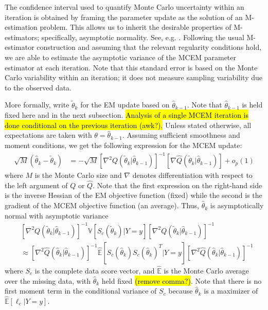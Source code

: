 \documentclass[11pt, oneside]{article}   	%
\newcommand{\bV}{\mathbb{V}}
\newcommand{\bE}{\mathbb{E}}
\newcommand{\hq}{\hat{Q}}
\begin{document}
The confidence interval used to quantify Monte Carlo uncertainty within an iteration is obtained by framing the parameter update as the solution of an M-estimation problem. This allows us to inherit the desirable properties of M-estimators; specifically, asymptotic normality. See, e.g. \citet{van98}. Following the usual M-estimator construction and assuming that the relevant regularity conditions hold, we are able to estimate the asymptotic variance of the MCEM parameter estimator at each iteration. Note that this standard error is based on the Monte Carlo variability within an iteration; it does not measure sampling variability due to the observed data. 

More formally, write $\tilde{\theta}_k$ for the EM update based on $\hat{\theta}_{k-1}$. Note that $\hat{\theta}_{k-1}$ is held fixed here and in the next subsection. \hl{Analysis of a single MCEM iteration is done conditional on the previous iteration (awk?).} Unless stated otherwise, all expectations are taken with $\theta = \hat{\theta}_{k-1}$. Assuming sufficient smoothness and moment conditions, we get the following expression for the MCEM update:
%
\begin{align}
    \sqrt{M}(\hat{\theta}_k - \tilde{\theta}_k) &= - \sqrt{M} \left[ \nabla^2 Q(\tilde{\theta}_k|\hat{\theta}_{k-1})\right]^{-1} \left[\nabla \hq(\tilde{\theta}_k|\hat{\theta}_{k-1}) \right] + o_p(1) \label{eq:th_as_dist}
\end{align}
%
where $M$ is the Monte Carlo size and $\nabla$ denotes differentiation with respect to the left argument of $Q$ or $\hat{Q}$. Note that the first expression on the right-hand side is the inverse Hessian of the EM objective function (fixed) while the second is the gradient of the MCEM objective function (an average). Thus, $\hat{\theta}_k$ is asymptotically normal with asymptotic variance
%
\begin{align}
    &\left[ \nabla^2 Q(\tilde{\theta}_k|\hat{\theta}_{k-1})\right]^{-1} \bV \left[ S_c (\tilde{\theta}_k) | Y=y \right] \left[ \nabla^2 Q(\tilde{\theta}_k|\hat{\theta}_{k-1})\right]^{-1}\\
    &\approx \left[ \nabla^2 \hat{Q}(\hat{\theta}_k|\hat{\theta}_{k-1})\right]^{-1} \hat{\bE} \left[ S_c(\hat{\theta}_k) S_c(\hat{\theta}_k)^T | Y=y \right] \left[ \nabla^2 \hat{Q}(\hat{\theta}_k|\hat{\theta}_{k-1})\right]^{-1} 
\end{align}
%
where $S_c$ is the complete data score vector, and $\hat{\bE}$ is the Monte Carlo average over the missing data, with $\hat{\theta}_k$ held fixed \hl{(remove comma?)}. Note that there is no first moment term in the conditional variance of $S_c$ because $\hat{\theta}_k$ is a maximizer of $\hat{\bE} [\ell_c |Y=y]$.
\end{document}

